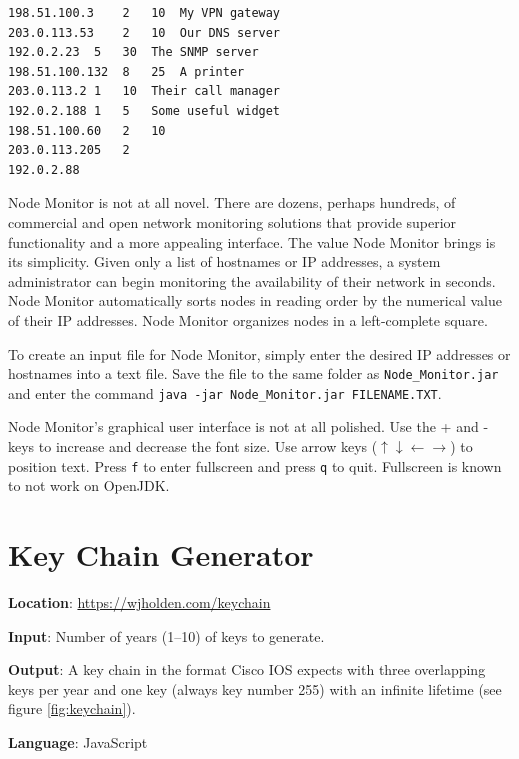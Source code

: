 \documentclass[12pt]{article}
\begin{document}
\begin{lstlisting}
198.51.100.3	2	10	My VPN gateway
203.0.113.53	2	10	Our DNS server
192.0.2.23	5	30	The SNMP server
198.51.100.132	8	25	A printer
203.0.113.2	1	10	Their call manager
192.0.2.188	1	5	Some useful widget
198.51.100.60	2	10
203.0.113.205	2
192.0.2.88
\end{lstlisting}

Node Monitor is not at all novel. There are dozens, perhaps hundreds, of commercial and open network monitoring solutions that provide superior functionality and a more appealing interface. The value Node Monitor brings is its simplicity. Given only a list of hostnames or IP addresses, a system administrator can begin monitoring the availability of their network in seconds. Node Monitor automatically sorts nodes in reading order by the numerical value of their IP addresses. Node Monitor organizes nodes in a left-complete square.

To create an input file for Node Monitor, simply enter the desired IP addresses or hostnames into a text file. Save the file to the same folder as \texttt{Node\_Monitor.jar} and enter the command \texttt{java -jar Node\_Monitor.jar FILENAME.TXT}.

Node Monitor's graphical user interface is not at all polished. Use the + and - keys to increase and decrease the font size. Use arrow keys ($\uparrow\downarrow\leftarrow\rightarrow$) to position text. Press \texttt{f} to enter fullscreen and press \texttt{q} to quit. Fullscreen is known to not work on OpenJDK.

\section{Key Chain Generator} \label{sec:KeyChain}

\textbf{Location}: \url{https://wjholden.com/keychain}

\textbf{Input}: Number of years (1--10) of keys to generate.

\textbf{Output}: A key chain in the format Cisco IOS expects with three overlapping keys per year and one key (always key number 255) with an infinite lifetime (see figure \ref{fig:keychain}).

\textbf{Language}: JavaScript
\end{document}
